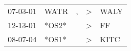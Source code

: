 \begin{supertabular}{lllll}
 07-03-01 &   WATR &  , &  \textgreater &  WALY \\
 12-13-01 &  *OS2* &    &  \textgreater &    FF \\
 08-07-04 &  *OS1* &    &  \textgreater &  KITC \\
\end{supertabular}
